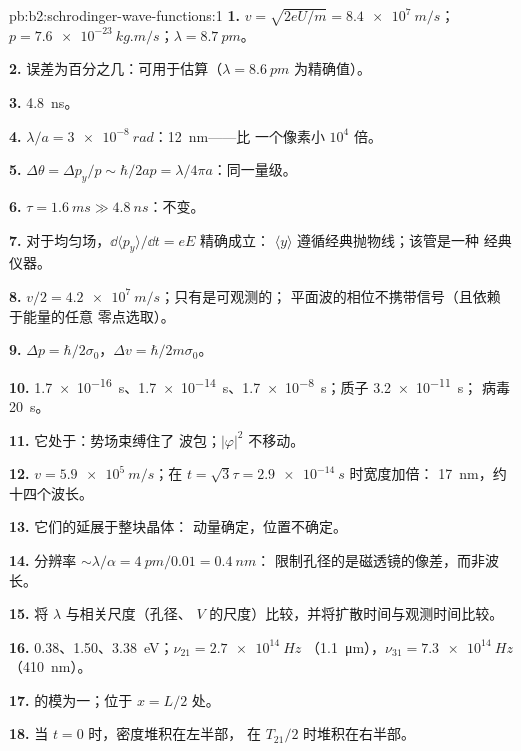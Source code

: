 \begin{solution}{pb:b2:schrodinger-wave-functions:1}
\textbf{1.} $v = \sqrt{2eU/m} = \qty{8.4e7}{m/s}$；$p = \qty{7.6e-23}{kg.m/s}$；$\lambda =
\qty{8.7}{pm}$。

\textbf{2.} 误差为百分之几：可用于估算（$\lambda =
\qty{8.6}{pm}$ 为精确值）。

\textbf{3.} \qty{4.8}{ns}。

\textbf{4.} $\lambda/a = \qty{3e-8}{rad}$：\qty{12}{nm}——比
一个像素小 $10^4$ 倍。

\textbf{5.} $\Delta\theta = \Delta p_y/p \sim \hbar/2ap = \lambda/4\pi a$：同一量级。

\textbf{6.} $\tau = \qty{1.6}{ms} \gg \qty{4.8}{ns}$：不变。

\textbf{7.} 对于均匀场，$\dd\langle p_y\rangle/\dd t = eE$ 精确成立：
$\langle y\rangle$ 遵循经典抛物线；该管是一种
经典仪器。

\textbf{8.} $v/2 = \qty{4.2e7}{m/s}$；只有是可观测的；
平面波的相位不携带信号（且依赖于能量的任意
零点选取）。

\textbf{9.} $\Delta p = \hbar/2\sigma_0$，$\Delta v = \hbar/2m\sigma_0$。

\textbf{10.} \qty{1.7e-16}{s}、\qty{1.7e-14}{s}、\qty{1.7e-8}{s}；质子 \qty{3.2e-11}{s}；
病毒 \qty{20}{s}。

\textbf{11.} 它处于：势场束缚住了
波包；$|\varphi|^2$ 不移动。

\textbf{12.} $v = \qty{5.9e5}{m/s}$；在 $t = \sqrt3\tau = \qty{2.9e-14}{s}$ 时宽度加倍：
\qty{17}{nm}，约十四个波长。

\textbf{13.} 它们的延展于整块晶体：
动量确定，位置不确定。

\textbf{14.} 分辨率 $\sim\lambda/\alpha = \qty{4}{pm}/0.01 = \qty{0.4}{nm}$：
限制孔径的是磁透镜的像差，而非波长。

\textbf{15.} 将 $\lambda$ 与相关尺度（孔径、
$V$ 的尺度）比较，并将扩散时间与观测时间比较。

\textbf{16.} \qty{0.38}{}、\qty{1.50}{}、\qty{3.38}{eV}；$\nu_{21} = \qty{2.7e14}{Hz}$
（\qty{1.1}{\micro m}），$\nu_{31} = \qty{7.3e14}{Hz}$（\qty{410}{nm}）。

\textbf{17.} 的模为一；位于 $x = L/2$ 处。

\textbf{18.} 当 $t = 0$ 时，密度堆积在左半部，
在 $T_{21}/2$ 时堆积在右半部。


\end{solution}
